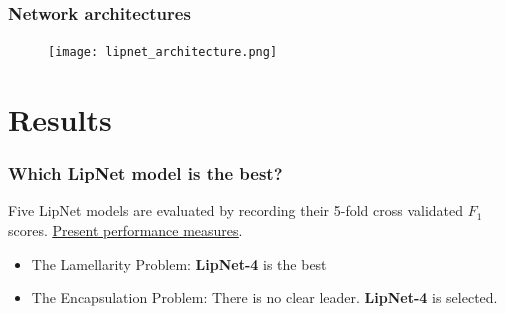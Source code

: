 \documentclass{beamer}
\begin{document}
%
%


%
%

\begin{frame}
\frametitle{Network architectures}

\begin{figure}
\centering
\texttt{[image: lipnet\_architecture.png]} 
\end{figure}

\end{frame}

%
%

\section{Results}
\begin{frame}[label=best_lipnet]
\frametitle{Which LipNet model is the best?}
Five LipNet models are evaluated by recording their 5-fold cross validated $F_1$ scores. \hyperlink{perf_measures}{\underline{Present performance measures}}. 
\vskip 0.2in
\begin{itemize}
\item<2-> The Lamellarity Problem: \textbf{LipNet-4} is the best
\item<3-> The Encapsulation Problem: There is no clear leader. \textbf{LipNet-4} is selected. 
\end{itemize}
\end{frame}
\end{document}
